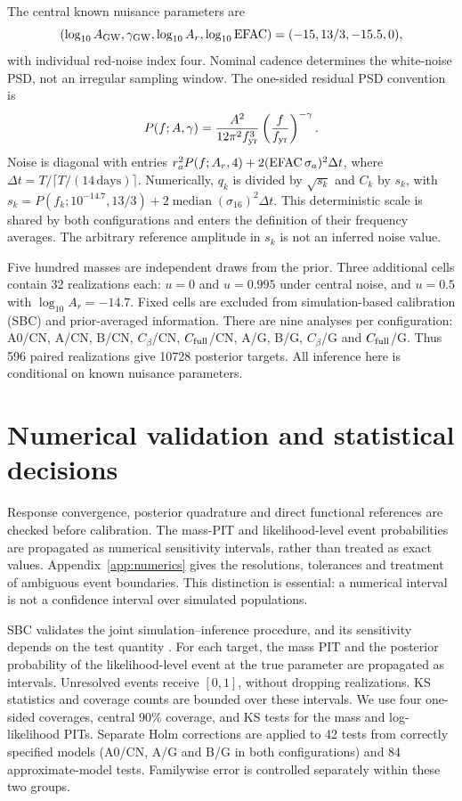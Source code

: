 \documentclass[11pt,a4paper]{article}
\begin{document}
The central known nuisance parameters are
\begin{equation}
 (\log_{10}A_{\rm GW},\gamma_{\rm GW},\log_{10}A_r,
 \log_{10}{\rm EFAC})=(-15,13/3,-15.5,0),
\end{equation}
with individual red-noise index four. Nominal cadence determines the white-noise PSD, not an irregular sampling window. The one-sided residual PSD convention is
\begin{equation}
P(f;A,\gamma)=\frac{A^2}{12\pi^2 f_{\rm yr}^3}\left(\frac{f}{f_{\rm yr}}\right)^{-\gamma}.
\end{equation} Noise is diagonal with entries $r_a^2P(f;A_r,4)+2({\rm EFAC}\,\sigma_a)^2\Delta t$, where $\Delta t=T/\lceil T/(14\,\mathrm{days})\rceil$. Numerically, $q_k$ is divided by $\sqrt{s_k}$ and $C_k$ by $s_k$, with $s_k=P(f_k;10^{-14.7},13/3)+2\operatorname{median}(\sigma_{16})^2\Delta t$. This deterministic scale is shared by both configurations and enters the definition of their frequency averages. The arbitrary reference amplitude in $s_k$ is not an inferred noise value.

Five hundred masses are independent draws from the prior. Three additional cells contain 32 realizations each: $u=0$ and $u=0.995$ under central noise, and $u=0.5$ with $\log_{10}A_r=-14.7$. Fixed cells are excluded from simulation-based calibration (SBC) and prior-averaged information. There are nine analyses per configuration: A0/CN, A/CN, B/CN, $C_\beta$/CN, $C_{\rm full}$/CN, A/G, B/G, $C_\beta$/G and $C_{\rm full}$/G. Thus 596 paired realizations give 10728 posterior targets. All inference here is conditional on known nuisance parameters.

\section{Numerical validation and statistical decisions}
Response convergence, posterior quadrature and direct functional references are checked before calibration. The mass-PIT and likelihood-level event probabilities are propagated as numerical sensitivity intervals, rather than treated as exact values. Appendix~\ref{app:numerics} gives the resolutions, tolerances and treatment of ambiguous event boundaries. This distinction is essential: a numerical interval is not a confidence interval over simulated populations.

SBC validates the joint simulation--inference procedure, and its sensitivity depends on the test quantity \cite{talts2018,modrak2025}. For each target, the mass PIT and the posterior probability of the likelihood-level event at the true parameter are propagated as intervals. Unresolved events receive $[0,1]$, without dropping realizations. KS statistics and coverage counts are bounded over these intervals. We use four one-sided coverages, central 90\% coverage, and KS tests for the mass and log-likelihood PITs. Separate Holm corrections are applied to 42 tests from correctly specified models (A0/CN, A/G and B/G in both configurations) and 84 approximate-model tests. Familywise error is controlled separately within these two groups.
\end{document}
